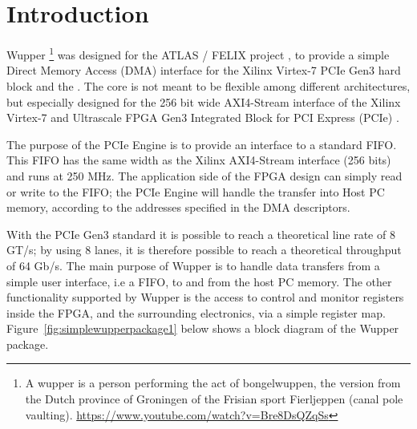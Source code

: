 \section{Introduction}
Wupper \footnote{A wupper is a person performing the act of bongelwuppen, the version from the Dutch province of Groningen of the Frisian sport Fierljeppen (canal pole vaulting). \href{https://www.youtube.com/watch?v=Bre8DsQZqSs}{https://www.youtube.com/watch?v=Bre8DsQZqSs}} was designed for the ATLAS / FELIX project \cite{atlas}, to provide a simple
Direct Memory Access (DMA) interface for the Xilinx  Virtex-7 PCIe Gen3 hard block and the . The core is not meant to be flexible among different architectures, but especially designed for the 256 bit wide AXI4-Stream interface
\cite{ug761}  of the Xilinx Virtex-7 and Ultrascale FPGA Gen3 Integrated Block for PCI Express (PCIe) \cite{xilinxcore}
\cite{pg023} \cite{pg156}. 

The purpose of the PCIe Engine is to provide an interface to a standard FIFO. This FIFO has the same width as the Xilinx AXI4-Stream interface (256 bits) and runs at 250 MHz. The application side of the FPGA design can simply read or write to the FIFO; the PCIe Engine will handle the transfer into Host PC memory, according to the addresses specified in the DMA descriptors.

With the PCIe Gen3 standard it is possible to reach a theoretical line rate of 8 GT/s; by using 8 lanes, it is therefore possible to reach a theoretical throughput of 64 Gb/s.
The main purpose of Wupper is to handle data transfers from a simple user interface, i.e a FIFO, to and from the host PC memory. The other functionality supported by Wupper is the access to control and monitor registers inside the FPGA, and the surrounding electronics, via a simple register map. Figure~\ref{fig:simplewupperpackage1} below shows a block diagram of the Wupper package.
 
